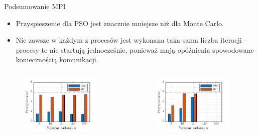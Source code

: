 \documentclass[handout]{beamer}
\begin{document}
\begin{frame}{Podsumowanie MPI}
\begin{itemize}
\item Przyspieszenie dla PSO jest znacznie mniejsze niż  dla Monte Carlo.
\item Nie zawsze w każdym z procesów jest wykonana taka sama liczba iteracji -- procesy te nie startują jednocześnie, ponieważ mają opóźnienia spowodowane koniecznością komunikacji.
\end{itemize}
\vspace{-.3cm}
\begin{columns}
\begin{column}[t]{0.5\textwidth}

\begin{figure}[t]
\includegraphics[width=0.9\textwidth]{grafiki/przyspieszenieMPI1.pdf}
\end{figure}

\end{column}
\begin{column}[t]{0.5\textwidth}

\begin{figure}[t]
\includegraphics[width=0.9\textwidth]{grafiki/przyspieszenieMPI2.pdf}
\end{figure}

\end{column}
\end{columns}
\end{frame}
\end{document}
